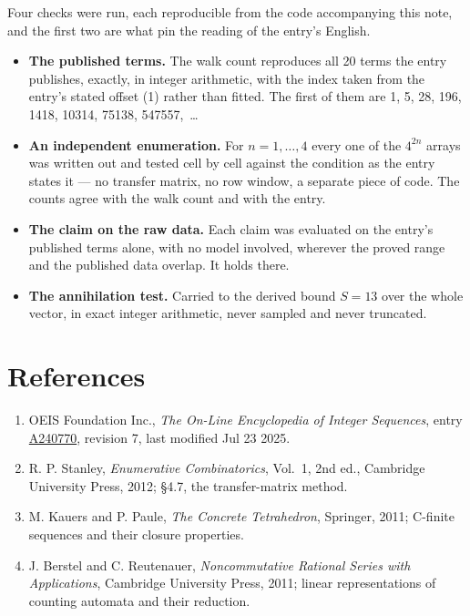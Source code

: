 \documentclass[11pt]{article}
\theoremstyle{definition}
\begin{document}
Four checks were run, each reproducible from the code accompanying this note, and the first two are what pin the reading of the entry's English.

\begin{itemize}

\item {\bfseries The published terms.} The walk count reproduces all 20 terms the entry publishes, exactly, in integer arithmetic, with the index taken from the entry's stated offset (1) rather than fitted. The first of them are 1, 5, 28, 196, 1418, 10314, 75138, 547557,~\dots

\item {\bfseries An independent enumeration.} For $n = 1,\dots,4$ every one of the $4^{2n}$ arrays was written out and tested cell by cell against the condition as the entry states it --- no transfer matrix, no row window, a separate piece of code. The counts agree with the walk count and with the entry.

\item {\bfseries The claim on the raw data.} Each claim was evaluated on the entry's published terms alone, with no model involved, wherever the proved range and the published data overlap. It holds there.

\item {\bfseries The annihilation test.} Carried to the derived bound $S = 13$ over the whole vector, in exact integer arithmetic, never sampled and never truncated.

\end{itemize}

\section{References}

\begin{enumerate}

\item OEIS Foundation Inc., \emph{The On-Line Encyclopedia of Integer Sequences}, entry \href{https://oeis.org/A240770}{A240770}, revision 7, last modified Jul 23 2025.

\item R. P. Stanley, \emph{Enumerative Combinatorics}, Vol.~1, 2nd ed., Cambridge University Press, 2012; \S4.7, the transfer-matrix method.

\item M. Kauers and P. Paule, \emph{The Concrete Tetrahedron}, Springer, 2011; C-finite sequences and their closure properties.

\item J. Berstel and C. Reutenauer, \emph{Noncommutative Rational Series with Applications}, Cambridge University Press, 2011; linear representations of counting automata and their reduction.

\end{enumerate}
\end{document}
